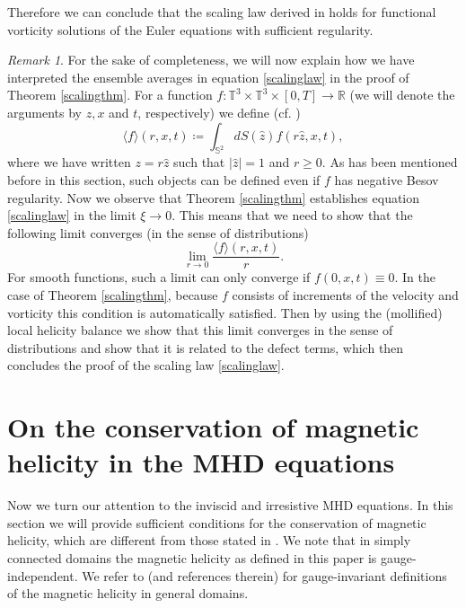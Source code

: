 \documentclass[12pt,a4paper]{article}
\theoremstyle{definition}
\theoremstyle{remark}
\newtheorem{remark}[theorem]{Remark}
\numberwithin{equation}{section}
\begin{document}
Therefore we can conclude that the scaling law derived in \cite{gomez} holds for functional vorticity solutions of the Euler equations with sufficient regularity. 
\begin{remark}
For the sake of completeness, we will now explain how we have interpreted the ensemble averages in equation \eqref{scalinglaw} in the proof of Theorem \ref{scalingthm}. For a function $f : \mathbb{T}^3 \times \mathbb{T}^3 \times [0,T] \rightarrow \mathbb{R}$ (we will denote the arguments by $z, x$ and $t$, respectively) we define (cf. \cite{duchon,eyinklocal})
\begin{equation} \label{ensembleaveragedefinition}
\langle f \rangle (r,x,t) \coloneqq \int_{\mathbb{S}^2} d S (\widehat{z}) f (r \widehat{z}, x,t),
\end{equation}
where we have written $z = r \widehat{z}$ such that $\lvert \widehat{z} \rvert = 1$ and $r \geq 0$. As has been mentioned before in this section, such objects can be defined even if $f$ has negative Besov regularity. Now we observe that Theorem \ref{scalingthm} establishes equation \eqref{scalinglaw} in the limit $\xi \rightarrow 0$. This means that we need to show that the following limit converges (in the sense of distributions)
\begin{equation*}
\lim_{r \rightarrow 0} \frac{\langle f \rangle (r,x,t)}{r}.
\end{equation*}
For smooth functions, such a limit can only converge if $f(0,x,t) \equiv 0$. In the case of Theorem \ref{scalingthm}, because $f$ consists of increments of the velocity and vorticity this condition is automatically satisfied. Then by using the (mollified) local helicity balance we show that this limit converges in the sense of distributions and show that it is related to the defect terms, which then concludes the proof of the scaling law \eqref{scalinglaw}.
\end{remark}


\section{On the conservation of magnetic helicity in the MHD equations} \label{MHDsection}
Now we turn our attention to the inviscid and irresistive MHD equations. In this section we will provide sufficient conditions for the conservation of magnetic helicity, which are different from those stated in \cite{kang}. We note that in simply connected domains the magnetic helicity as defined in this paper is gauge-independent. We refer to \cite{faraco} (and references therein) for gauge-invariant definitions of the magnetic helicity in general domains. 
\end{document}
